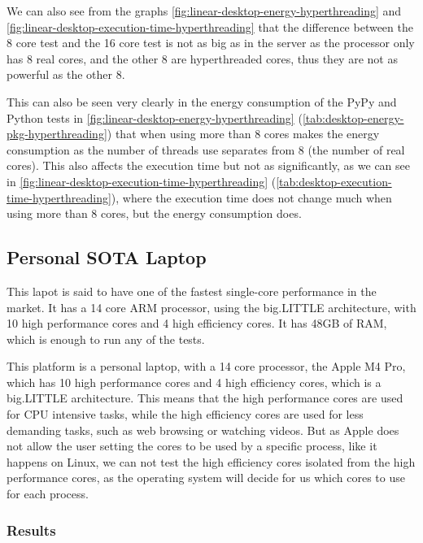 We can also see from the graphs \autoref{fig:linear-desktop-energy-hyperthreading} and \autoref{fig:linear-desktop-execution-time-hyperthreading} that the difference between the 8 core test and the 16 core test is not as big as in the server as the processor only has 8 real cores, and the other 8 are hyperthreaded cores, thus they are not as powerful as the other 8. 

This can also be seen very clearly in the energy consumption of the PyPy and Python tests in \autoref{fig:linear-desktop-energy-hyperthreading} (\autoref{tab:desktop-energy-pkg-hyperthreading}) that when using more than 8 cores makes the energy consumption as the number of threads use separates from 8 (the number of real cores). This also affects the execution time but not as significantly, as we can see in \autoref{fig:linear-desktop-execution-time-hyperthreading} (\autoref{tab:desktop-execution-time-hyperthreading}), where the execution time does not change much when using more than 8 cores, but the energy consumption does.



\subsection{Personal SOTA Laptop}
This lapot is said to have one of the fastest single-core performance in the market. It has a 14 core ARM processor, using the big.LITTLE architecture, with 10 high performance cores and 4 high efficiency cores. It has 48GB of RAM, which is enough to run any of the tests.


This platform is a personal laptop, with a 14 core processor, the Apple M4 Pro, which has 10 high performance cores and 4 high efficiency cores, which is a big.LITTLE architecture. This means that the high performance cores are used for CPU intensive tasks, while the high efficiency cores are used for less demanding tasks, such as web browsing or watching videos. But as Apple does not allow the user setting the cores to be used by a specific process, like it happens on Linux, we can not test the high efficiency cores isolated from the high performance cores, as the operating system will decide for us which cores to use for each process. 

\subsubsection{Results}




